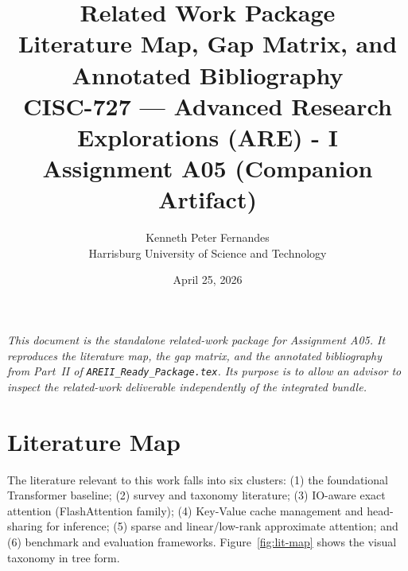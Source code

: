 \documentclass[11pt]{article}
\title{%
    \textbf{Related Work Package}\\[0.3em]
    \large Literature Map, Gap Matrix, and Annotated Bibliography\\[0.5em]
    \large CISC-727 --- Advanced Research Explorations (ARE) - I\\[0.2em]
    \large Assignment A05 (Companion Artifact)
}
\author{%
    Kenneth Peter Fernandes\\
    Harrisburg University of Science and Technology
}
\date{April 25, 2026}
\begin{document}
\maketitle

\noindent\textit{This document is the standalone related-work package for Assignment A05. It reproduces the literature map, the gap matrix, and the annotated bibliography from Part~II of \texttt{AREII\_Ready\_Package.tex}. Its purpose is to allow an advisor to inspect the related-work deliverable independently of the integrated bundle.}

\section{Literature Map}

The literature relevant to this work falls into six clusters: (1) the foundational Transformer baseline; (2) survey and taxonomy literature; (3) IO-aware exact attention (FlashAttention family); (4) Key-Value cache management and head-sharing for inference; (5) sparse and linear/low-rank approximate attention; and (6) benchmark and evaluation frameworks. Figure~\ref{fig:lit-map} shows the visual taxonomy in tree form.
\end{document}
